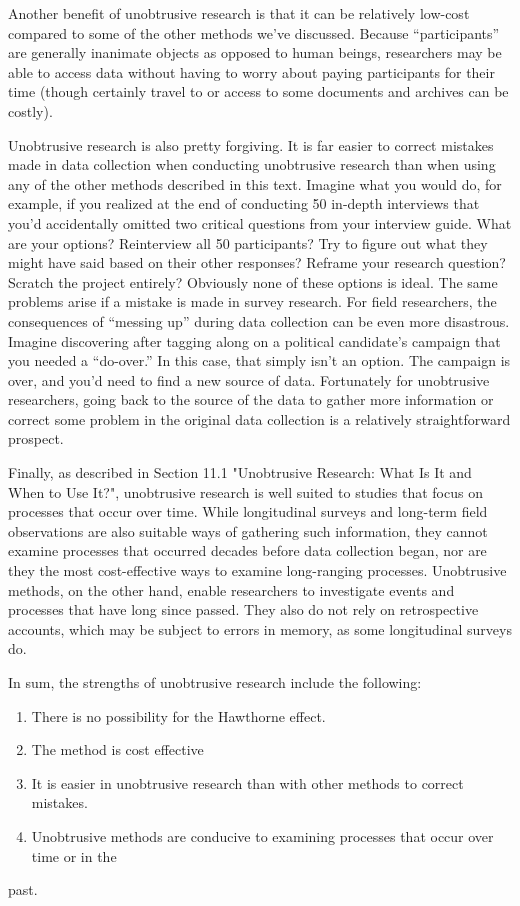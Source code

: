 Another benefit of unobtrusive research is that it can be relatively low-cost compared to some of the other methods we’ve discussed. Because “participants” are generally inanimate objects as opposed to human beings, researchers may be able to access data without having to worry about paying participants for their time (though certainly travel to or access to some documents and archives can be costly).

Unobtrusive research is also pretty forgiving. It is far easier to correct mistakes made in data collection when conducting unobtrusive research than when using any of the other methods described in this text. Imagine what you would do, for example, if you realized at the end of conducting 50 in-depth interviews that you’d accidentally omitted two critical questions from your interview guide. What are your options? Reinterview all 50 participants? Try to figure out what they might have said based on their other responses? Reframe your research question? Scratch the project entirely? Obviously none of these options is ideal. The same problems arise if a mistake is made in survey research. For field researchers, the consequences of “messing up” during data collection can be even more disastrous. Imagine discovering after tagging along on a political candidate’s campaign that you needed a “do-over.” In this case, that simply isn’t an option. The campaign is over, and you’d need to find a new source of data. Fortunately for unobtrusive researchers, going back to the source of the data to gather more information or correct some problem in the original data collection is a relatively straightforward prospect.

Finally, as described in Section 11.1 "Unobtrusive Research: What Is It and When to Use It?", unobtrusive research is well suited to studies that focus on processes that occur over time. While longitudinal surveys and long-term field observations are also suitable ways of gathering such information, they cannot examine processes that occurred decades before data collection began, nor are they the most cost-effective ways to examine long-ranging processes. Unobtrusive methods, on the other hand, enable researchers to investigate events and processes that have long since passed. They also do not rely on retrospective accounts, which may be subject to errors in memory, as some longitudinal surveys do.

In sum, the strengths of unobtrusive research include the following:

\begin{enumerate}
	\item There is no possibility for the Hawthorne effect.
	\item The method is cost effective
	\item It is easier in unobtrusive research than with other methods to correct mistakes.
	\item Unobtrusive methods are conducive to examining processes that occur over time or in the 
\end{enumerate}past.

